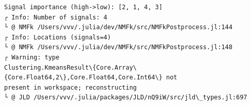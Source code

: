 \documentclass[11pt]{article}
\begin{document}
    \begin{center}
    \end{center}
    { \hspace*{\fill} \\}
    
    \begin{center}
    \end{center}
    { \hspace*{\fill} \\}
    
    \begin{Verbatim}[commandchars=\\\{\}]

    \end{Verbatim}

    \begin{center}
    \end{center}
    { \hspace*{\fill} \\}
    
    \begin{center}
    \end{center}
    { \hspace*{\fill} \\}
    
    \begin{Verbatim}[commandchars=\\\{\}]

    \end{Verbatim}

    \begin{center}
    \end{center}
    { \hspace*{\fill} \\}
    
    \begin{Verbatim}[commandchars=\\\{\}]
Signal importance (high->low): [2, 1, 4, 3]
┌ Info: Number of signals: 4
└ @ NMFk /Users/vvv/.julia/dev/NMFk/src/NMFkPostprocess.jl:144
┌ Info: Locations (signals=4)
└ @ NMFk /Users/vvv/.julia/dev/NMFk/src/NMFkPostprocess.jl:148
┌ Warning: type
Clustering.KmeansResult\{Core.Array\{Core.Float64,2\},Core.Float64,Core.Int64\} not
present in workspace; reconstructing
└ @ JLD /Users/vvv/.julia/packages/JLD/nQ9iW/src/jld\_types.jl:697
    \end{Verbatim}
\end{document}
